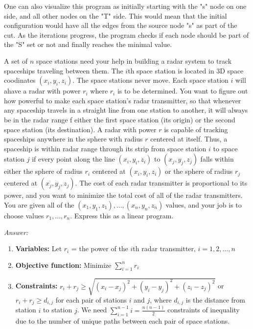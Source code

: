 \documentclass[12pt]{article}
\newenvironment{problem}[2][Problem]{\begin{trivlist}
\item[\hskip \labelsep {\bfseries #1}\hskip \labelsep {\bfseries #2.}]}{\end{trivlist}}
\begin{document}
One can also visualize this program as initially starting with the "s" node on one side, and all other nodes on the "T" side. This would mean that the initial configuration would have all the edges from the source node "s" as part of the cut. As the iterations progress, the program checks if each node should be part of the "S" set or not and finally reaches the minimal value.

\begin{problem}{3}
    A set of $n$ space stations need your help in building a radar system to track spaceships traveling between them. The $i$th space station is located in 3D space coodinates $(x_i, y_i, z_i)$. The space stations never move. Each space station $i$ will ahave a radar with power $r_i$ where $r_i$ is to be determined. You want to figure out how powerful to make each space station's radar transmitter, so that whenever any spaceship travels in a straight line from one station to another, it will always be in the radar range f either the first space station (its origin) or the second space station (its destination). A radar with power $r$ is capable of tracking spaceships anywhere in the sphere with radius $r$ centered at itself. Thus, a spaceship is within radar range through its strip from space station $i$ to space station $j$ if every point along the line $(x_i, y_i, z_i)$ to $(x_j, y_j, z_j)$ falls within either the sphere of radius $r_i$ centered at $(x_i, y_i, z_i)$ or the sphere of radius $r_j$ centered at $(x_j, y_j, z_j)$. The cost of each radar transmitter is proportional to its power, and you want to minimize the total cost of all of the radar transmitters. You are given all of the $(x_1, y_1, z_1), ..., (x_n, y_n, z_n)$ values, and your job is to choose values $r_1, ..., r_n$. Express this as a linear program. 
\end{problem}

\textit{Answer: }

\begin{enumerate}
    \item \textbf{Variables:}
    Let $r_i$ = the power of the $i$th radar transmitter, $i=1,2,\dots,n$
    \item \textbf{Objective function:}
Minimize $\sum_{i=1}^n r_i$
    \item \textbf{Constraints:}
$r_i + r_j \geq \sqrt{(x_i - x_j)^2 + (y_i - y_j)^2 + (z_i - z_j)^2}$ or $r_i+r_j \geq d_{i,j}$ for each pair of stations $i$ and $j$, where $d_{i,j}$ is the distance from station $i$ to station $j$. We need $\sum_{i=1}^{n-1} i = \frac{n(n - 1)}{2}$ constraints of inequality due to the number of unique paths between each pair of space stations.
\end{enumerate}
\end{document}
